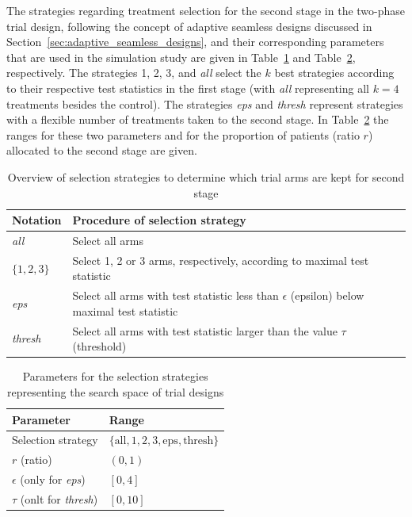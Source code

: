 \documentclass[bimj,fleqn]{w-art}
\theoremstyle{plain}
\theoremstyle{definition}
\begin{document}
The strategies regarding treatment selection for the second stage in the two-phase trial design, following the concept of adaptive seamless designs discussed in Section~\ref{sec:adaptive_seamless_designs}, and their corresponding parameters that are used in the simulation study are given in Table~\ref{tab:selection_strategies} and Table~\ref{tab:search_space}, respectively.
The strategies 1, 2, 3, and \emph{all} select the $k$ best strategies according to their respective test statistics in the first stage (with \emph{all} representing all $k=4$ treatments besides the control). The strategies \emph{eps} and \emph{thresh} represent strategies with a flexible number of treatments taken to the second stage. 
In Table~\ref{tab:search_space} the ranges for these two parameters and for the proportion of patients (ratio $r$) allocated to the second stage are given.
\begin{table}[h]
  \caption{Overview of selection strategies to determine which trial arms are kept for second stage}
  \label{tab:selection_strategies}
  \centering
  \begin{tabular}{ll}
  \hline
  Notation       & Procedure of selection strategy  \\
  \hline
  \emph{all}     & Select all arms  \\
  $\{1,2,3\}$    & Select 1, 2 or 3 arms, respectively, according to maximal test statistic \\
  \emph{eps}     & Select all arms with test statistic less than $\epsilon$ (epsilon) below maximal test statistic \\
  \emph{thresh}  & Select all arms with test statistic larger than the value $\tau$ (threshold) \\
  \hline
  \end{tabular}
\end{table}
\begin{table}[h]
  \caption{Parameters for the selection strategies representing the search space of trial designs}
  \label{tab:search_space}
  \centering
  \begin{tabular}{ll}
  \hline
  Parameter                        & Range \\
  \hline
  Selection strategy               & $\{\text{all}, 1, 2, 3, \text{eps}, \text{thresh} \}$ \\
  $r$ (ratio)                      & $(0,1)$ \\
  $\epsilon$ (only for \emph{eps}) & $[0,4]$ \\
  $\tau$ (onlt for \emph{thresh})  & $[0,10]$ \\
  \hline
  \end{tabular}
\end{table}
\end{document}
